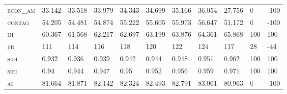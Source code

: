 \begin{sidewaystable}[!htbp]
\begin{tabular}{@{}lllllllllll@{}}
\small \textsc{econ\_am}        & 33.142          & 33.518          & 33.979           & 34.343           & 34.699           & 35.166           & 36.054            & 27.756        & 0                                                                & -100                                                               \\
\small \textsc{contag}          & 54.205          & 54.481          & 54.874           & 55.222           & 55.605           & 55.973           & 56.647            & 51.172        & 0                                                                & -100                                                               \\
\small \textsc{iji }            & 60.367          & 61.568          & 62.217           & 62.697           & 63.199           & 63.876           & 64.361            & 65.868        & 100                                                              & 100                                                                \\
\small \textsc{pr}              & 111             & 114             & 116              & 118              & 120              & 122              & 124               & 117           & 28                                                               & -44                                                                \\
\small \textsc{sidi}            & 0.932           & 0.936           & 0.939            & 0.942            & 0.944            & 0.948            & 0.951             & 0.962         & 100                                                              & 100                                                                \\
\small \textsc{siei}            & 0.94            & 0.944           & 0.947            & 0.95             & 0.952            & 0.956            & 0.959             & 0.971         & 100                                                              & 100                                                                \\
\small \textsc{ai}              & 81.664          & 81.871          & 82.142           & 82.324           & 82.493           & 82.791           & 83.061            & 80.963        & 0                                                                & -100                                                               \\ \bottomrule
\end{tabular}
\end{sidewaystable}


